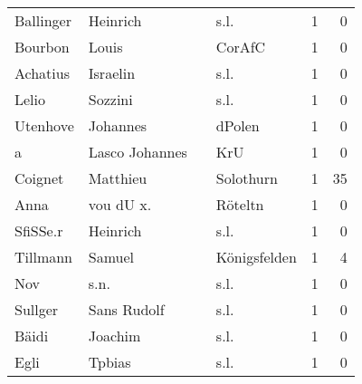 \begin{center}
\begin{tiny}
\begin{longtabu}{llllrr}
                Ballinger &                           Heinrich &             &                                        s.l. &          1 &         0 \\
                  Bourbon &                              Louis &             &                                      CorAfC &          1 &         0 \\
                 Achatius &                           Israelin &             &                                        s.l. &          1 &         0 \\
                    Lelio &                            Sozzini &             &                                        s.l. &          1 &         0 \\
                 Utenhove &                           Johannes &             &                                      dPolen &          1 &         0 \\
                        a &                     Lasco Johannes &             &                                         KrU &          1 &         0 \\
                  Coignet &                           Matthieu &             &                                   Solothurn &          1 &        35 \\
                     Anna &                          vou dU x. &             &                                     Röteltn &          1 &         0 \\
                 SfiSSe.r &                           Heinrich &             &                                        s.l. &          1 &         0 \\
                 Tillmann &                             Samuel &             &                                Königsfelden &          1 &         4 \\
                      Nov &                               s.n. &             &                                        s.l. &          1 &         0 \\
                  Sullger &                        Sans Rudolf &             &                                        s.l. &          1 &         0 \\
                    Bäidi &                            Joachim &             &                                        s.l. &          1 &         0 \\
                     Egli &                             Tpbias &             &                                        s.l. &          1 &         0 \\

\end{longtabu}
\end{tiny}
\end{center}
